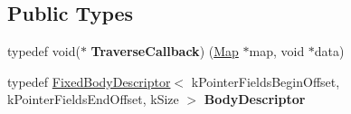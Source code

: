 \subsection*{Public Types}
\begin{DoxyCompactItemize}
\item 
\hypertarget{classv8_1_1internal_1_1_map_a3e19f4f3d8d21d76cf73459bcc06ac58}{}typedef void($\ast$ {\bfseries Traverse\+Callback}) (\hyperlink{classv8_1_1internal_1_1_map}{Map} $\ast$map, void $\ast$data)\label{classv8_1_1internal_1_1_map_a3e19f4f3d8d21d76cf73459bcc06ac58}

\item 
\hypertarget{classv8_1_1internal_1_1_map_a3a7765ae1b838d6f5b8b87b1955b9e96}{}typedef \hyperlink{classv8_1_1internal_1_1_fixed_body_descriptor}{Fixed\+Body\+Descriptor}$<$ k\+Pointer\+Fields\+Begin\+Offset, k\+Pointer\+Fields\+End\+Offset, k\+Size $>$ {\bfseries Body\+Descriptor}\label{classv8_1_1internal_1_1_map_a3a7765ae1b838d6f5b8b87b1955b9e96}

\end{DoxyCompactItemize}
